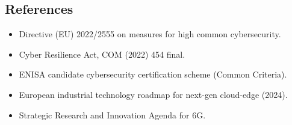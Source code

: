 \documentclass{ieeeaccess}
\begin{document}
\subsection{References}
\begin{itemize}[leftmargin=1.5cm, labelsep=0.2cm]
    \item[{[NIS2]}] Directive (EU) 2022/2555 on measures for high common cybersecurity.
    \item[{[CRA]}] Cyber Resilience Act, COM (2022) 454 final.
    \item[{[EUCC]}] ENISA candidate cybersecurity certification scheme (Common Criteria).
    \item[{[Cloud-Edge]}] European industrial technology roadmap for next-gen cloud-edge (2024).
    \item[{[SNS JU]}] Strategic Research and Innovation Agenda for 6G.
\end{itemize}
\end{document}
